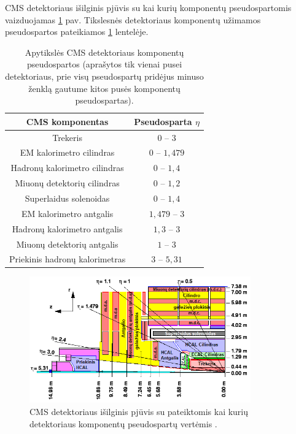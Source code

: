\documentclass[a4paper, 12pt]{article}
\begin{document}
CMS detektoriaus išilginis pjūvis su kai kurių komponentų pseudospartomis vaizduojamas \ref{fig:cmseta} pav. Tikslesnės detektoriaus komponentų užimamos pseudospartos pateikiamos \ref{table:cmseta} lentelėje.

\begin{table}[H]
\centering
\begin{tabular}{|c|c|}
\hline
CMS komponentas & Pseudosparta $\eta$\\
\hline\hline
Trekeris & $0$ -- $3$\\
\hline
EM kalorimetro cilindras & $0$ -- $1,479$\\
\hline
Hadronų kalorimetro cilindras & $0$ -- $1,4$\\
\hline
Miuonų detektorių cilindras & $0$ -- $1,2$\\
\hline
Superlaidus solenoidas & $0$ -- $1,4$\\
\hline
EM kalorimetro antgalis & $1,479$ -- $3$\\
\hline
Hadronų kalorimetro antgalis & $1,3$ -- $3$\\
\hline
Miuonų detektorių antgalis & $1$ -- $3$\\
\hline
Priekinis hadronų kalorimetras & $3$ -- $5,31$\\
\hline
\end{tabular}
\caption{Apytikslės CMS detektoriaus komponentų pseudospartos (aprašytos tik vienai pusei detektoriaus, prie visų pseudospartų pridėjus minuso ženklą gautume kitos pusės komponentų pseudospartas)\cite{cmseta}.}
\label{table:cmseta}
\end{table}

\begin{figure}[H]
\centering
\includegraphics[width=0.85\textwidth]{CMSeta_LT.PNG}
\caption{CMS detektoriaus išilginis pjūvis su pateiktomis kai kurių detektoriaus komponentų pseudospartų vertėmis \cite{cmseta}.}
\label{fig:cmseta}
\end{figure}
\end{document}
